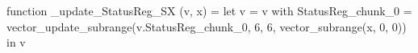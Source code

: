 function _update_StatusReg_SX (v, x) = let v = { v with StatusReg_chunk_0 = vector_update_subrange(v.StatusReg_chunk_0, 6, 6, vector_subrange(x, 0, 0)) } in v

